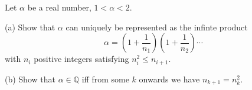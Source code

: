 Let $\alpha$ be a real number, $1<\alpha<2$.

(a) Show that $\alpha$ can uniquely be represented as the infinte product \[ \alpha = \left(1+\dfrac1{n_1}\right)\left(1+\dfrac1{n_2}\right)\cdots \] with $n_i$ positive integers satisfying $n_i^2\le n_{i+1}$.

(b) Show that $\alpha\in\mathbb{Q}$ iff from some $k$ onwards we have $n_{k+1}=n_k^2$.